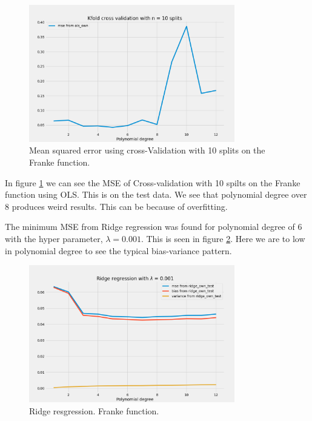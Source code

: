 \begin{figure}[H]
    \centering
    \includegraphics[width=0.8\textwidth]{Figures/d_kfold_ols_n_10.png}
    \caption{Mean squared error using cross-Validation with 10 splits on the Franke function.}
    \label{fig:kfold_ols_franke}
\end{figure}

In figure \ref{fig:kfold_ols_franke} we can see the MSE of Cross-validation with 10 spilts on the Franke function using OLS. This is on the test data. We see that polynomial degree over 8 produces weird results. This can be because of overfitting. 


The minimum MSE from Ridge regression was found for polynomial degree of 6 with
the hyper parameter, $\lambda = 0.001$. This is seen in figure \ref{fig:ridge_blabla}. Here we are to low in polynomial degree to see the typical bias-variance pattern.

\begin{figure}[H]
    \centering
    \caption{Ridge resgression. Franke function.}
    \label{fig:ridge_blabla}
    \includegraphics[width=0.8\textwidth]{Figures/e_ridge_bias_variance_lamb_0_001.png}
\end{figure}


